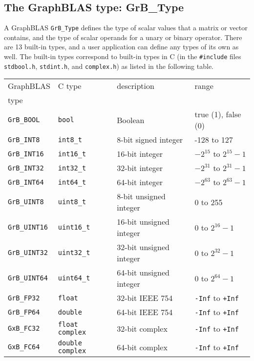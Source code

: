 \documentclass[12pt]{article}
\begin{document}
\subsection{The GraphBLAS type: {\sf GrB\_Type}} %
\label{type}

A GraphBLAS \verb'GrB_Type' defines the type of scalar values that a matrix or
vector contains, and the type of scalar operands for a unary or binary
operator.  There are 13 built-in types, and a user application can define
any types of its own as well.  The built-in types correspond to built-in types
in C (in the \verb'#include' files \verb'stdbool.h', \verb'stdint.h', and
\verb'complex.h') as listed in the following table.

\vspace{0.2in}
\noindent
{\footnotesize
\begin{tabular}{llll}
\hline
GraphBLAS         & C type           & description              & range \\
type              &                  &                          & \\
\hline
\verb'GrB_BOOL'   & \verb'bool'      & Boolean                  & true (1), false (0) \\
\hline
\verb'GrB_INT8'   & \verb'int8_t'    & 8-bit signed integer     & -128 to 127 \\
\verb'GrB_INT16'  & \verb'int16_t'   & 16-bit integer           & $-2^{15}$ to $2^{15}-1$ \\
\verb'GrB_INT32'  & \verb'int32_t'   & 32-bit integer           & $-2^{31}$ to $2^{31}-1$ \\
\verb'GrB_INT64'  & \verb'int64_t'   & 64-bit integer           & $-2^{63}$ to $2^{63}-1$ \\
\hline
\verb'GrB_UINT8'  & \verb'uint8_t'   & 8-bit unsigned integer   & 0 to 255 \\
\verb'GrB_UINT16' & \verb'uint16_t'  & 16-bit unsigned integer  & 0 to $2^{16}-1$ \\
\verb'GrB_UINT32' & \verb'uint32_t'  & 32-bit unsigned integer  & 0 to $2^{32}-1$ \\
\verb'GrB_UINT64' & \verb'uint64_t'  & 64-bit unsigned integer  & 0 to $2^{64}-1$ \\
\hline
\verb'GrB_FP32'   & \verb'float'     & 32-bit IEEE 754          & \verb'-Inf' to \verb'+Inf'\\
\verb'GrB_FP64'   & \verb'double'    & 64-bit IEEE 754          & \verb'-Inf' to \verb'+Inf'\\
\hline
\verb'GxB_FC32'   & \verb'float complex'  & 32-bit complex & \verb'-Inf' to \verb'+Inf'\\
\verb'GxB_FC64'   & \verb'double complex' & 64-bit complex & \verb'-Inf' to \verb'+Inf'\\
\hline
\end{tabular}
}
\vspace{0.2in}
\end{document}
